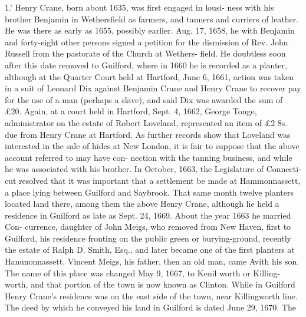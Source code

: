\documentclass[oneside]{book}
\begin{document}
1.' Henry Crane, born about 1635, was first engaged in lousi- 
ness with his brother Benjamin in Wethersfield as farmers, and 
tanners and curriers of leather. He was there as early as 
1655, possibly earlier. Aug. 17, 1658, he with Benjamin and 
forty-eight other persons signed a petition for the dismission of 
Rev. John Russell from the pastorate of the Church at Wethers- 
field. He doubtless soon after this date removed to Guilford, 
where in 1660 he is recorded as a planter, although at the 
Quarter Court held at Hartford, June 6, 1661, action was taken 
in a suit of Leonard Dix against Benjamin Crane and Henry 
Crane to recover pay for the use of a man (perhaps a slave), and 
said Dix was awarded the sum of £20. Again, at a court held 
in Hartford, Sept. 4, 1662, George Tonge, administrator on the 
estate of Robert Loveland, represented an item of £2 8s. due 
from Henry Crane at Hartford. As further records show that 
Loveland was interested in the sale of hides at New London, it is 
fair to suppose that the above account referred to may have con- 
nection with the tanning business, and while he was associated 
with his brother. In October, 1663, the Legislature of Connecti- 
cut resolved that it was important that a settlement be made at 
Hammonnassett, a place lying between Guilford and Saybrook. 
That same month twelve planters located land there, among them 
the above Henry Crane, although lie held a residence in Guilford 
as late as Sept. 24, 1669. About the year 1663 he married Con- 
currence, daughter of John Meigs, who removed from New 
Haven, first to Guilford, his residence fronting on the public 
green or burying-ground, recently the estate of Ralph D. Smith, 
Esq., and later became one of the first planters at Hanunonnassett. 
Vincent Meigs, his father, then an old man, came Avith his son. 
The name of this place was changed May 9, 1667, to Kenil worth 
or Killing-worth, and that portion of the town is now known as 
Clinton. While in Guilford Henry Crane's residence was on the 
east side of the town, near Killingworth line. The deed by which 
he conveyed his land in Guilford is dated June 29, 1670. The 
\end{document}
